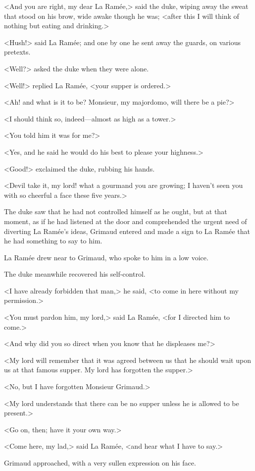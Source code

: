 <And you are right, my dear La Ramée,> said the duke, wiping away the sweat that stood on his brow, wide awake though he was; <after this I will think of nothing but eating and drinking.>

<Hush!> said La Ramée; and one by one he sent away the guards, on various pretexts.

<Well?> asked the duke when they were alone.

<Well!> replied La Ramée, <your supper is ordered.>

<Ah! and what is it to be? Monsieur, my majordomo, will there be a pie?>

<I should think so, indeed—almost as high as a tower.>

<You told him it was for me?>

<Yes, and he said he would do his best to please your highness.>

<Good!> exclaimed the duke, rubbing his hands.

<Devil take it, my lord! what a gourmand you are growing; I haven't seen you with so cheerful a face these five years.>

The duke saw that he had not controlled himself as he ought, but at that moment, as if he had listened at the door and comprehended the urgent need of diverting La Ramée's ideas, Grimaud entered and made a sign to La Ramée that he had something to say to him.

La Ramée drew near to Grimaud, who spoke to him in a low voice.

The duke meanwhile recovered his self-control.

<I have already forbidden that man,> he said, <to come in here without my permission.>

<You must pardon him, my lord,> said La Ramée, <for I directed him to come.>

<And why did you so direct when you know that he displeases me?>

<My lord will remember that it was agreed between us that he should wait upon us at that famous supper. My lord has forgotten the supper.>

<No, but I have forgotten Monsieur Grimaud.>

<My lord understands that there can be no supper unless he is allowed to be present.>

<Go on, then; have it your own way.>

<Come here, my lad,> said La Ramée, <and hear what I have to say.>

Grimaud approached, with a very sullen expression on his face.

